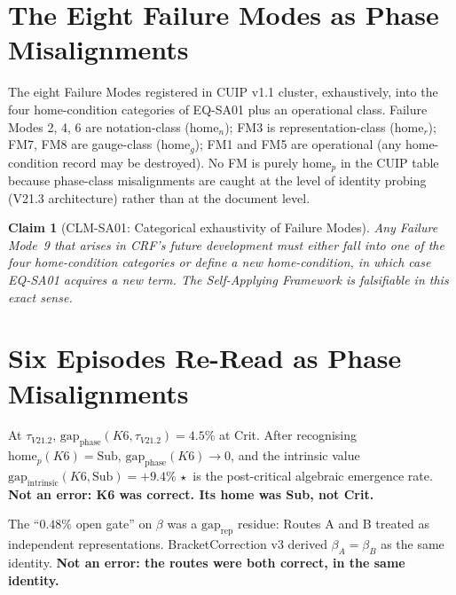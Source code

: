 \documentclass[12pt, a4paper]{article}
\newtheorem{claim}{Claim}[section]
\begin{document}
\section{The Eight Failure Modes as Phase Misalignments}

The eight Failure Modes registered in CUIP v1.1 cluster, exhaustively,
into the four home-condition categories of EQ-SA01 plus an operational
class. Failure Modes 2, 4, 6 are notation-class
($\mathrm{home}_n$); FM3 is representation-class ($\mathrm{home}_r$);
FM7, FM8 are gauge-class ($\mathrm{home}_g$); FM1 and FM5 are
operational (any home-condition record may be destroyed). No FM is
purely $\mathrm{home}_p$ in the CUIP table because phase-class
misalignments are caught at the level of identity probing (V21.3
architecture) rather than at the document level.

\begin{claim}[CLM-SA01: Categorical exhaustivity of Failure Modes]
Any Failure Mode~9 that arises in CRF's future development must
either fall into one of the four home-condition categories or define
a new home-condition, in which case EQ-SA01 acquires a new term.
The Self-Applying Framework is falsifiable in this exact sense.
\end{claim}

\section{Six Episodes Re-Read as Phase Misalignments}

\begin{formalbox}[title={FIND-SA01: K6 phase relocation (E1)}]
At $\tau_{V21.2}$, $\mathrm{gap}_{\mathrm{phase}}(K6, \tau_{V21.2}) =
4.5\%$ at Crit. After recognising $\mathrm{home}_p(K6) = \mathrm{Sub}$,
$\mathrm{gap}_{\mathrm{phase}}(K6) \to 0$, and the intrinsic value
$\mathrm{gap}_{\mathrm{intrinsic}}(K6, \mathrm{Sub}) = +9.4\%\,\star$
is the post-critical algebraic emergence rate.
\textbf{Not an error: K6 was correct. Its home was Sub, not Crit.}
\end{formalbox}

\begin{formalbox}[title={FIND-SA02: $\beta$-Routes (E2)}]
The ``$0.48\%$ open gate'' on $\beta$ was a $\mathrm{gap}_{\mathrm{rep}}$
residue: Routes A and B treated as independent representations.
BracketCorrection v3 derived $\beta_A = \beta_B$ as the same identity.
\textbf{Not an error: the routes were both correct, in the same identity.}
\end{formalbox}
\end{document}
